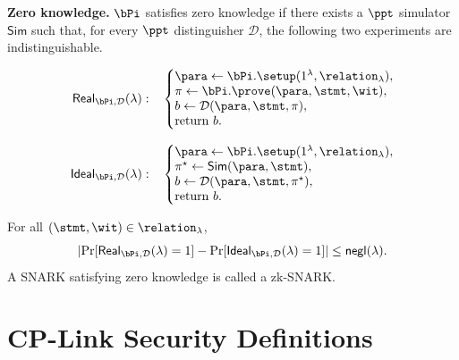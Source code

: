 \noindent\textbf{Zero knowledge.}
\(\bPi\) satisfies zero knowledge if there exists a \(\ppt\) simulator
\(\mathsf{Sim}\) such that, for every \(\ppt\) distinguisher
\(\mathcal{D}\), the following two experiments are indistinguishable.

\[
\begin{aligned}
\mathsf{Real}_{\bPi,\mathcal{D}}(\lambda):
\quad
&\left\{
\begin{array}{@{}l@{}}
  \para\gets\bPi.\setup(1^\lambda,\relation_\lambda),\\
  \pi\gets\bPi.\prove(\para,\stmt,\wit),\\
  b\gets\mathcal{D}(\para,\stmt,\pi),\\
  \text{return } b.
\end{array}
\right.
\\[3mm]
\mathsf{Ideal}_{\bPi,\mathcal{D}}(\lambda):
\quad
&\left\{
\begin{array}{@{}l@{}}
  \para\gets\bPi.\setup(1^\lambda,\relation_\lambda),\\
  \pi^\star\gets\mathsf{Sim}(\para,\stmt),\\
  b\gets\mathcal{D}(\para,\stmt,\pi^\star),\\
  \text{return } b.
\end{array}
\right.
\end{aligned}
\]

For all \((\stmt,\wit)\in\relation_\lambda\),
\[
\left|
  \Pr[\mathsf{Real}_{\bPi,\mathcal{D}}(\lambda)=1]
  -
  \Pr[\mathsf{Ideal}_{\bPi,\mathcal{D}}(\lambda)=1]
\right|
\le
\textsf{negl}(\lambda).
\]
A SNARK satisfying zero knowledge is called a zk-SNARK.

\section{CP-Link Security Definitions}
\label{app:cplink-security}

